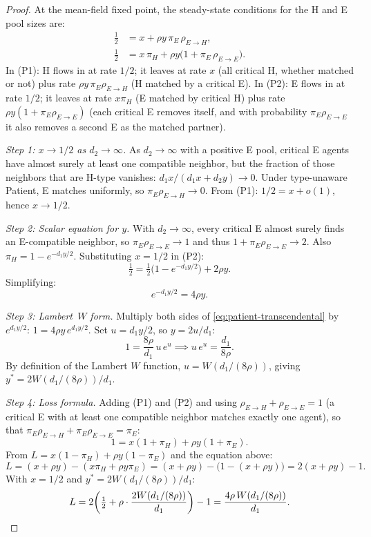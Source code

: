 \documentclass{article}
\theoremstyle{plain}
\theoremstyle{definition}
\begin{document}
\begin{proof}
At the mean-field fixed point, the steady-state conditions for the H and E
pool sizes are:
\begin{align}
  \tfrac{1}{2}
    &= x + \rho y\,\pi_E\,\rho_{E\to H},
    \tag{P1}\\
  \tfrac{1}{2}
    &= x\,\pi_H + \rho y\bigl(1+\pi_E\,\rho_{E\to E}\bigr).
    \tag{P2}
\end{align}
In (P1): H flows in at rate $1/2$; it leaves at rate $x$ (all critical H,
whether matched or not) plus rate $\rho y\,\pi_E\rho_{E\to H}$ (H matched by
a critical E).  In (P2): E flows in at rate $1/2$; it leaves at rate
$x\pi_H$ (E matched by critical H) plus rate $\rho y(1+\pi_E\rho_{E\to E})$
(each critical E removes itself, and with probability $\pi_E\rho_{E\to E}$
it also removes a second E as the matched partner).

\emph{Step 1: $x\to 1/2$ as $d_2\to\infty$.}
As $d_2\to\infty$ with a positive E pool, critical E agents have almost
surely at least one compatible neighbor, but the fraction of those neighbors
that are H-type vanishes: $d_1 x/(d_1 x+d_2 y)\to 0$.  Under type-unaware
Patient, E matches uniformly, so $\pi_E\rho_{E\to H}\to 0$.  From (P1):
$1/2=x+o(1)$, hence $x\to 1/2$.

\emph{Step 2: Scalar equation for $y$.}
With $d_2\to\infty$, every critical E almost surely finds an E-compatible
neighbor, so $\pi_E\rho_{E\to E}\to 1$ and thus $1+\pi_E\rho_{E\to E}\to 2$.
Also $\pi_H=1-e^{-d_1 y/2}$.  Substituting $x=1/2$ in (P2):
\[
  \tfrac{1}{2}
    = \tfrac{1}{2}\bigl(1-e^{-d_1 y/2}\bigr) + 2\rho y.
\]
Simplifying:
\begin{equation}\label{eq:patient-transcendental}
  e^{-d_1 y/2} = 4\rho y.
\end{equation}

\emph{Step 3: Lambert~$W$ form.}
Multiply both sides of \eqref{eq:patient-transcendental} by $e^{d_1 y/2}$:
$1=4\rho y\,e^{d_1 y/2}$.  Set $u=d_1 y/2$, so $y=2u/d_1$:
\[
  1 = \frac{8\rho}{d_1}\,u\,e^u
  \implies
  u\,e^u = \frac{d_1}{8\rho}.
\]
By definition of the Lambert $W$ function, $u=W(d_1/(8\rho))$, giving
$y^*=2W(d_1/(8\rho))/d_1$.

\emph{Step 4: Loss formula.}
Adding (P1) and (P2) and using $\rho_{E\to H}+\rho_{E\to E}=1$ (a critical
E with at least one compatible neighbor matches exactly one agent), so that
$\pi_E\rho_{E\to H}+\pi_E\rho_{E\to E}=\pi_E$:
\[
  1 = x(1+\pi_H)+\rho y(1+\pi_E).
\]
From $L=x(1-\pi_H)+\rho y(1-\pi_E)$ and the equation above:
\[
  L = (x+\rho y)-(x\pi_H+\rho y\pi_E)
    = (x+\rho y)-\bigl(1-(x+\rho y)\bigr) = 2(x+\rho y)-1.
\]
With $x=1/2$ and $y^*=2W(d_1/(8\rho))/d_1$:
\[
  L = 2\!\left(\tfrac{1}{2}+\rho\cdot\frac{2W(d_1/(8\rho))}{d_1}\right)-1
    = \frac{4\rho\,W(d_1/(8\rho))}{d_1}. \qedhere
\]
\end{proof}
\end{document}
